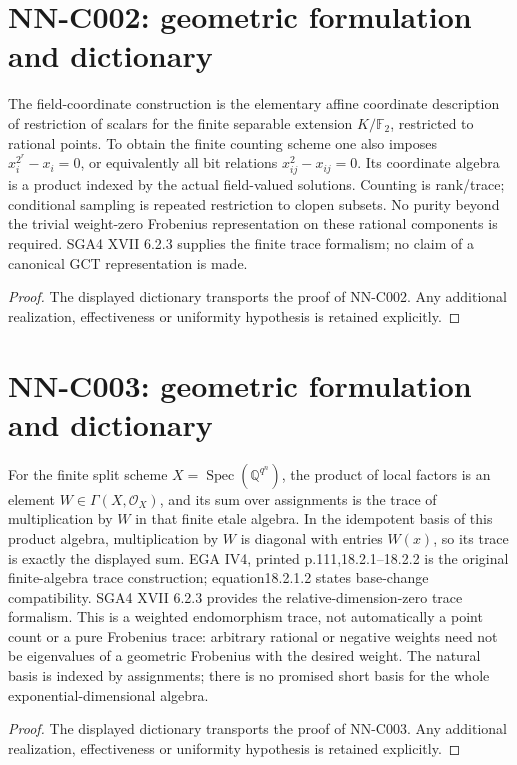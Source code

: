 \section{NN-C002: geometric formulation and dictionary}
\begin{geometricstatement}[NN-C002]
The field-coordinate construction is the elementary affine coordinate description of restriction of scalars for the finite separable extension $K/\mathbb F_2$, restricted to rational points. To obtain the finite counting scheme one also imposes $x_i^{2^r}-x_i=0$, or equivalently all bit relations $x_{ij}^2-x_{ij}=0$. Its coordinate algebra is a product indexed by the actual field-valued solutions. Counting is rank/trace; conditional sampling is repeated restriction to clopen subsets. No purity beyond the trivial weight-zero Frobenius representation on these rational components is required. SGA4 XVII 6.2.3 supplies the finite trace formalism; no claim of a canonical GCT representation is made.
\end{geometricstatement}
\begin{proof} The displayed dictionary transports the proof of NN-C002. Any additional realization, effectiveness or uniformity hypothesis is retained explicitly.\end{proof}


\section{NN-C003: geometric formulation and dictionary}
\begin{geometricstatement}[NN-C003]
For the finite split scheme $X=\operatorname{Spec}(\mathbb Q^{q^n})$, the product of local factors is an element $W\in\Gamma(X,\mathcal O_X)$, and its sum over assignments is the trace of multiplication by $W$ in that finite etale algebra. In the idempotent basis of this product algebra, multiplication by $W$ is diagonal with entries $W(x)$, so its trace is exactly the displayed sum. EGA IV4, printed p.111,18.2.1--18.2.2 is the original finite-algebra trace construction; equation18.2.1.2 states base-change compatibility. SGA4 XVII 6.2.3 provides the relative-dimension-zero trace formalism. This is a weighted endomorphism trace, not automatically a point count or a pure Frobenius trace: arbitrary rational or negative weights need not be eigenvalues of a geometric Frobenius with the desired weight. The natural basis is indexed by assignments; there is no promised short basis for the whole exponential-dimensional algebra.
\end{geometricstatement}
\begin{proof} The displayed dictionary transports the proof of NN-C003. Any additional realization, effectiveness or uniformity hypothesis is retained explicitly.\end{proof}


